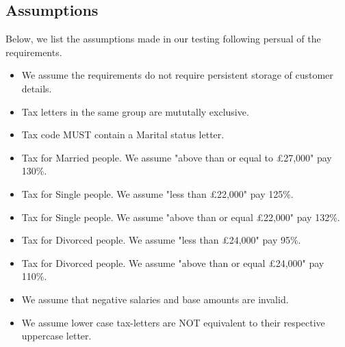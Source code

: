 \subsection{Assumptions}
Below, we list the assumptions made in our testing following persual of the requirements. 
\begin{itemize}
    \item We assume the requirements do not require persistent storage of customer details.
    \item Tax letters in the same group are mututally exclusive. 
    \item Tax code MUST contain a Marital status letter. 
    \item Tax for Married people. We assume "above than or equal to £27,000" pay 130\%. 
    \item Tax for Single people. We assume "less than £22,000" pay 125\%. 
    \item Tax for Single people. We assume "above than or equal £22,000" pay 132\%. 
    \item Tax for Divorced people. We assume "less than £24,000" pay 95\%.
    \item Tax for Divorced people. We assume "above than or equal £24,000" pay 110\%.
    \item We assume that negative salaries and base amounts are invalid.
    \item We assume lower case tax-letters are NOT equivalent to their respective uppercase letter. 
\end{itemize}